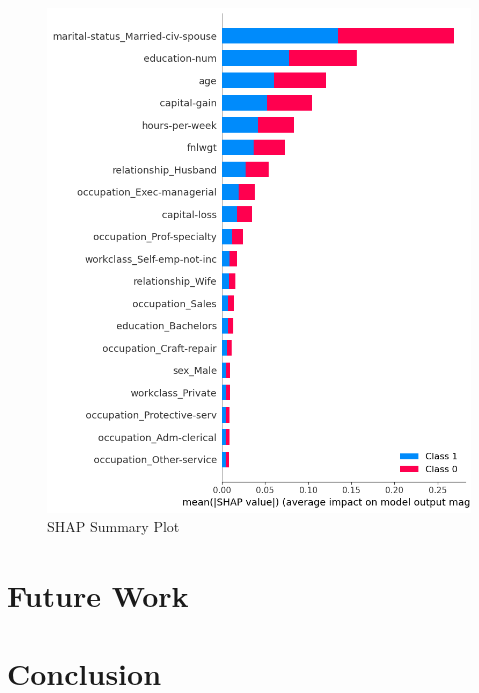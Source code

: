 \documentclass[10pt,journal,compsoc]{IEEEtran}
\begin{document}
\begin{figure}[h]
    \centering
    \includegraphics[width=0.9\linewidth]{images/shap_summary_plot.png}
    \caption{SHAP Summary Plot}
    \label{fig:shap_summary_plot}
    \end{figure}


\section{Future Work}


\section{Conclusion}



\printbibliography
\end{document}
